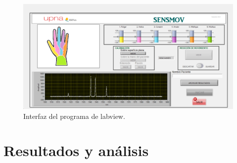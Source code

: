 \begin{figure}[H]
	\centering
	\includegraphics[width=1\textwidth]{./img/interfazSM}
	\caption{Interfaz del programa de labview.}
	\label{fig:interfaz}
\end{figure}




\section{Resultados y análisis}
\label{sec:resultados3}

